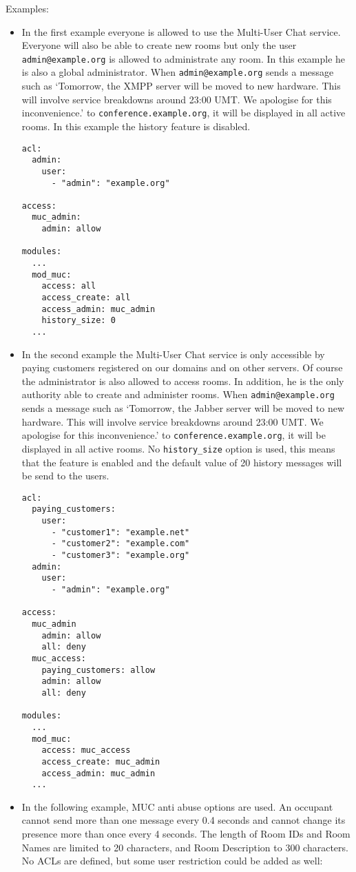 \documentclass[a4paper,10pt]{book}
\newcommand{\jid}[1]{\texttt{#1}}
\newcommand{\term}[1]{\texttt{#1}}
\newcommand{\Jabber}{Jabber}
\newcommand{\XMPP}{XMPP}
\begin{document}
Examples:
\begin{itemize}
\item In the first example everyone is allowed to use the Multi-User Chat
  service. Everyone will also be able to create new rooms but only the user
  \jid{admin@example.org} is allowed to administrate any room. In this
  example he is also a global administrator. When \jid{admin@example.org}
  sends a message such as `Tomorrow, the \XMPP{} server will be moved
  to new hardware. This will involve service breakdowns around 23:00 UMT.
  We apologise for this inconvenience.' to \jid{conference.example.org},
  it will be displayed in all active rooms. In this example the history
  feature is disabled.
\begin{verbatim}
acl:
  admin:
    user:
      - "admin": "example.org"

access:
  muc_admin:
    admin: allow

modules:
  ...
  mod_muc:
    access: all
    access_create: all
    access_admin: muc_admin
    history_size: 0
  ...
\end{verbatim}
\item In the second example the Multi-User Chat service is only accessible by
  paying customers registered on our domains and on other servers. Of course
  the administrator is also allowed to access rooms. In addition, he is the
  only authority able to create and administer rooms. When
  \jid{admin@example.org} sends a message such as `Tomorrow, the \Jabber{}
  server will be moved to new hardware. This will involve service breakdowns
  around 23:00 UMT. We apologise for this inconvenience.' to
  \jid{conference.example.org}, it will be displayed in all active rooms. No
  \term{history\_size} option is used, this means that the feature is enabled
  and the default value of 20 history messages will be send to the users.
\begin{verbatim}
acl:
  paying_customers:
    user:
      - "customer1": "example.net"
      - "customer2": "example.com"
      - "customer3": "example.org"
  admin:
    user:
      - "admin": "example.org"

access:
  muc_admin
    admin: allow
    all: deny
  muc_access:
    paying_customers: allow
    admin: allow
    all: deny

modules:
  ...
  mod_muc:
    access: muc_access
    access_create: muc_admin
    access_admin: muc_admin
  ...
\end{verbatim}

\item In the following example, MUC anti abuse options are used. An
occupant cannot send more than one message every 0.4 seconds and cannot
change its presence more than once every 4 seconds.
The length of Room IDs and Room Names are limited to 20 characters,
and Room Description to 300 characters. No ACLs are
defined, but some user restriction could be added as well:


\end{itemize}
\end{document}
